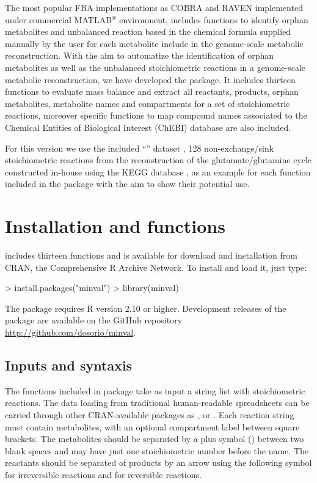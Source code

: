 The most popular FBA implementations as COBRA and RAVEN implemented under commercial MATLAB$^{\circledR}$ environment, includes functions to identify orphan metabolites and unbalanced reaction based in the chemical formula supplied manually by the user for each metabolite include in the genome-scale metabolic reconstruction. With the aim to automatize the identification of orphan metabolites as well as the unbalanced stoichiometric reactions in a genome-scale metabolic reconstruction, we have developed the  package. It includes thirteen functions to evaluate mass balance and extract all reactants, products, orphan metabolites, metabolite names and compartments for a set of stoichiometric reactions, moreover specific functions to map compound names associated to the Chemical Entities of Biological Interest (ChEBI) database are also included.

For this version we use the included ``'' dataset \citep{NelsonE.2015}, 128 non-exchange/sink stoichiometric reactions from the reconstruction of the glutamate/glutamine cycle constructed in-house using the KEGG database , as an example for each function included in the  package with the aim to show their potential use.



\section{Installation and functions}
 includes thirteen functions and is available for download and installation from CRAN, the
Comprehensive R Archive Network. To install and load it, just type:
\begin{Schunk}
\begin{Sinput}
> install.packages("minval")
> library(minval)
\end{Sinput}
\end{Schunk}
The  package requires R version 2.10 or higher. Development releases of the package are available on the GitHub repository \url{http://github.com/dosorio/minval}.
\subsection{Inputs and syntaxis}
The functions included in  package take as input a string list with stoichiometric reactions. The data loading from traditional human-readable spreadsheets can be carried through other CRAN-available packages as ,  or . Each reaction string must contain metabolites, with an optional compartment label between square brackets. The metabolites should be separated by a plus symbol (\code{+}) between two blank spaces and may have just one stoichiometric number before the name. The reactants should be separated of products by an arrow using the following symbol \code{=>} for irreversible reactions and \code{<=>} for reversible reactions.
